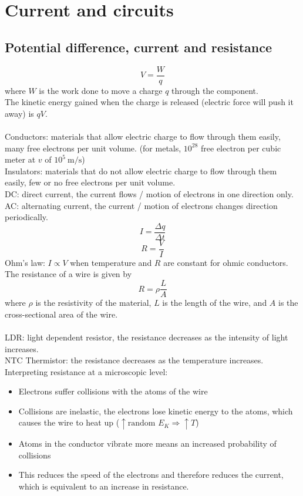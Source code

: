 \section{Current and circuits}
\subsection{Potential difference, current and resistance}
$$V=\dfrac{W}{q}$$
where $W$ is the work done to move a charge $q$ through the component.\\
The kinetic energy gained when the charge is released (electric force will push it away) is $qV$.\\\\
Conductors: materials that allow electric charge to flow through them easily, many free electrons per unit volume. (for metals, $10^{28}$ free electron per cubic meter at $v$ of $10^5\ \text{m/s}$)\\
Insulators: materials that do not allow electric charge to flow through them easily, few or no free electrons per unit volume.\\
DC: direct current, the current flows / motion of electrons in one direction only.\\
AC: alternating current, the current / motion of electrons changes direction periodically.\\
$$I=\dfrac{\Delta q}{\Delta t}$$
$$R=\dfrac{V}{I}$$
Ohm's law: $I\propto V$ when temperature and $R$ are constant for ohmic conductors.\\
The resistance of a wire is given by
\[R=\rho\dfrac{L}{A}\]
where $\rho$ is the resistivity of the material, $L$ is the length of the wire, and $A$ is the cross-sectional area of the wire.\\\\
LDR: light dependent resistor, the resistance decreases as the intensity of light increases.\\
NTC Thermistor: the resistance decreases as the temperature increases.\\
Interpreting resistance at a microscopic level: 
\begin{itemize}
  \item Electrons suffer collisions with the atoms of the wire
  \item Collisions are inelastic, the electrons lose kinetic energy to the atoms, which causes the wire to heat up ($\uparrow \text{random }E_K \Rightarrow \uparrow T$)
  \item Atoms in the conductor vibrate more means an increased probability of collisions
  \item This reduces the speed of the electrons and therefore reduces the current, which is equivalent to an increase in resistance.
\end{itemize}
